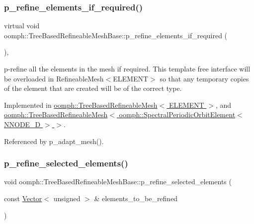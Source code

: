 \subsubsection{\texorpdfstring{p\+\_\+refine\+\_\+elements\+\_\+if\+\_\+required()}{p\_refine\_elements\_if\_required()}}
{\footnotesize\ttfamily virtual void oomph\+::\+Tree\+Based\+Refineable\+Mesh\+Base\+::p\+\_\+refine\+\_\+elements\+\_\+if\+\_\+required (\begin{DoxyParamCaption}{ }\end{DoxyParamCaption})\hspace{0.3cm}{\ttfamily [protected]}, {}}



p-\/refine all the elements in the mesh if required. This template free interface will be overloaded in Refineable\+Mesh$<$\+E\+L\+E\+M\+E\+N\+T$>$ so that any temporary copies of the element that are created will be of the correct type. 



Implemented in \hyperlink{classoomph_1_1TreeBasedRefineableMesh_aa47363e7700089d4b8756b2339c4893c}{oomph\+::\+Tree\+Based\+Refineable\+Mesh$<$ E\+L\+E\+M\+E\+N\+T $>$}, and \hyperlink{classoomph_1_1TreeBasedRefineableMesh_aa47363e7700089d4b8756b2339c4893c}{oomph\+::\+Tree\+Based\+Refineable\+Mesh$<$ oomph\+::\+Spectral\+Periodic\+Orbit\+Element$<$ N\+N\+O\+D\+E\+\_\+D $>$ $>$}.



Referenced by p\+\_\+adapt\+\_\+mesh().

\mbox{\label{classoomph_1_1TreeBasedRefineableMeshBase_a8596076849247d63cadfe579fdc17d60}} 
\subsubsection{\texorpdfstring{p\+\_\+refine\+\_\+selected\+\_\+elements()}{p\_refine\_selected\_elements()}\hspace{0.1cm}{\footnotesize\ttfamily [1/2]}}
{\footnotesize\ttfamily void oomph\+::\+Tree\+Based\+Refineable\+Mesh\+Base\+::p\+\_\+refine\+\_\+selected\+\_\+elements (\begin{DoxyParamCaption}\item[{const \hyperlink{classoomph_1_1Vector}{Vector}$<$ unsigned $>$ \&}]{elements\+\_\+to\+\_\+be\+\_\+refined }\end{DoxyParamCaption})}



